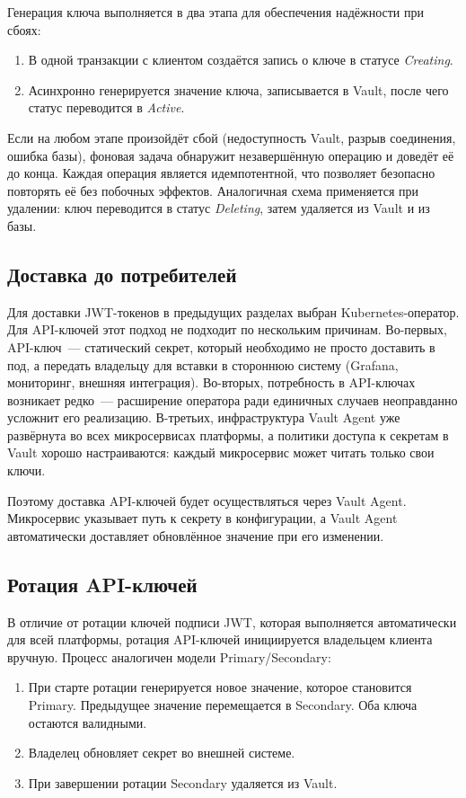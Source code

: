 Генерация ключа выполняется в два этапа
для обеспечения надёжности при сбоях:
\begin{enumerate}
  \item В одной транзакции с клиентом создаётся запись о ключе
    в статусе \emph{Creating}.
  \item Асинхронно генерируется значение ключа,
    записывается в Vault, после чего статус переводится в \emph{Active}.
\end{enumerate}

Если на любом этапе произойдёт сбой
(недоступность Vault, разрыв соединения, ошибка базы),
фоновая задача обнаружит незавершённую операцию
и доведёт её до конца.
Каждая операция является идемпотентной,
что позволяет безопасно повторять её без побочных эффектов.
Аналогичная схема применяется при удалении:
ключ переводится в статус \emph{Deleting},
затем удаляется из Vault и из базы.

\subsection{Доставка до потребителей}\label{subsec:api-key-delivery}

Для доставки JWT-токенов в предыдущих разделах выбран Kubernetes-оператор.
Для API-ключей этот подход не подходит по нескольким причинам.
Во-первых, API-ключ~--- статический секрет,
который необходимо не просто доставить в под,
а передать владельцу для вставки в стороннюю систему
(Grafana, мониторинг, внешняя интеграция).
Во-вторых, потребность в API-ключах возникает редко~---
расширение оператора ради единичных случаев
неоправданно усложнит его реализацию.
В-третьих, инфраструктура Vault Agent
уже развёрнута во всех микросервисах платформы,
а политики доступа к секретам в Vault хорошо настраиваются:
каждый микросервис может читать только свои ключи.

Поэтому доставка API-ключей будет осуществляться через Vault Agent.
Микросервис указывает путь к секрету в конфигурации,
а Vault Agent автоматически доставляет обновлённое значение при его изменении.

\subsection{Ротация API-ключей}\label{subsec:api-key-rotation}

В отличие от ротации ключей подписи JWT,
которая выполняется автоматически для всей платформы,
ротация API-ключей инициируется владельцем клиента вручную.
Процесс аналогичен модели Primary/Secondary:
\begin{enumerate}
  \item При старте ротации генерируется новое значение,
    которое становится Primary.
    Предыдущее значение перемещается в Secondary.
    Оба ключа остаются валидными.
  \item Владелец обновляет секрет во внешней системе.
  \item При завершении ротации Secondary удаляется из Vault.
\end{enumerate}

